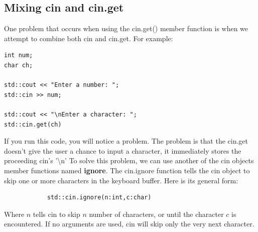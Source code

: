 \documentclass{report}
\begin{document}
    \bigbreak \noindent 
    \subsection{Mixing cin and cin.get}
    \bigbreak \noindent 
    One problem that occurs when using the cin.get() member function is when we attempt to combine both cin and cin.get. For example:
    \smallbreak \noindent
    \sepline
    \begin{verbatim}
int num;
char ch;

std::cout << "Enter a number: ";
std::cin >> num;

std::cout << "\nEnter a character: ";
std::cin.get(ch)
    \end{verbatim}
    \sepline
    \bigbreak \noindent 
    If you run this code, you will notice a problem. The problem is that the cin.get doesn't give the user a chance to input a character, it immediately stores the proceeding cin's '\textbackslash n'
    \bigbreak \noindent 
    To solve this problem, we can use another of the cin objects member functions named \textbf{ignore}. The cin.ignore function tells the cin object to skip one or more characters in the keyboard buffer. Here is its general form:
    \smallbreak \noindent
    \sepline
    \begin{verbatim}
            std::cin.ignore(n:int,c:char)
    \end{verbatim}
    \sepline
    \bigbreak \noindent 
    Where $n$ tells cin to skip $n$ number of characters, or until the character $c$ is encountered. If no arguments are used, cin will skip only the very next character.





    \pagebreak \bigbreak \noindent 
\end{document}
